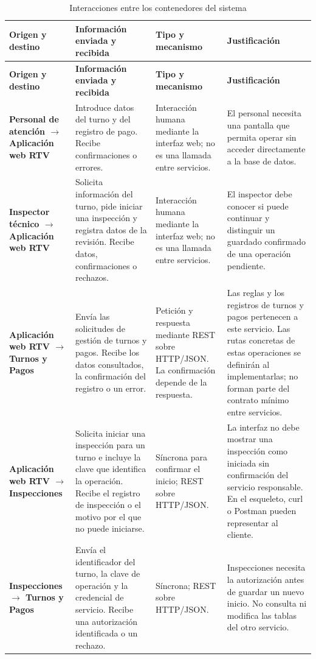 \documentclass[11pt,a4paper]{article}
\begin{document}
\begin{xltabular}{\textwidth}{L{2.9cm}XXX}
  \caption{Interacciones entre los contenedores del sistema}\label{tab:comunicacion}\\
  \toprule
  \textbf{Origen y destino} & \textbf{Información enviada y recibida} & \textbf{Tipo y mecanismo} & \textbf{Justificación} \\
  \midrule
  \endfirsthead
  \toprule
  \textbf{Origen y destino} & \textbf{Información enviada y recibida} & \textbf{Tipo y mecanismo} & \textbf{Justificación} \\
  \midrule
  \endhead
  \bottomrule
  \endfoot
  \textbf{Personal de atención $\rightarrow$ Aplicación web RTV} & Introduce datos del turno y del registro de pago. Recibe confirmaciones o errores. & Interacción humana mediante la interfaz web; no es una llamada entre servicios. & El personal necesita una pantalla que permita operar sin acceder directamente a la base de datos. \\
  \textbf{Inspector técnico $\rightarrow$ Aplicación web RTV} & Solicita información del turno, pide iniciar una inspección y registra datos de la revisión. Recibe datos, confirmaciones o rechazos. & Interacción humana mediante la interfaz web; no es una llamada entre servicios. & El inspector debe conocer si puede continuar y distinguir un guardado confirmado de una operación pendiente. \\
  \textbf{Aplicación web RTV $\rightarrow$ Turnos y Pagos} & Envía las solicitudes de gestión de turnos y pagos. Recibe los datos consultados, la confirmación del registro o un error. & Petición y respuesta mediante REST sobre HTTP/JSON. La confirmación depende de la respuesta. & Las reglas y los registros de turnos y pagos pertenecen a este servicio. Las rutas concretas de estas operaciones se definirán al implementarlas; no forman parte del contrato mínimo entre servicios. \\
  \textbf{Aplicación web RTV $\rightarrow$ Inspecciones} & Solicita iniciar una inspección para un turno e incluye la clave que identifica la operación. Recibe el registro de inspección o el motivo por el que no puede iniciarse. & Síncrona para confirmar el inicio; REST sobre HTTP/JSON. & La interfaz no debe mostrar una inspección como iniciada sin confirmación del servicio responsable. En el esqueleto, curl o Postman pueden representar al cliente. \\
  \textbf{Inspecciones $\rightarrow$ Turnos y Pagos} & Envía el identificador del turno, la clave de operación y la credencial de servicio. Recibe una autorización identificada o un rechazo. & Síncrona; REST sobre HTTP/JSON. & Inspecciones necesita la autorización antes de guardar un nuevo inicio. No consulta ni modifica las tablas del otro servicio. \\

\end{xltabular}
\end{document}
